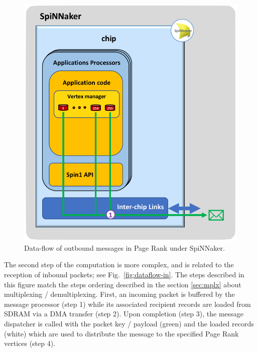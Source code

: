 \begin{figure}[hbtp]
\centering 
\includegraphics[width=0.82\hsize]{figures/impl-dataflow-out.png}
\caption{Data-flow of outbound messages in Page Rank under SpiNNaker.}
\label{fig:dataflow-out}
\end{figure}

The second step of the computation is more complex, and is related to the reception of inbound packets; see Fig.~\ref{fig:dataflow-in}. The steps described in this figure match the steps ordering described in the section \ref{sec:mplx} about multiplexing / demultiplexing. First, an incoming packet is buffered by the message processor (step 1) while its associated recipient records are loaded from SDRAM via a DMA transfer (step 2). Upon completion (step 3), the message dispatcher is called with the packet key / payload (green) and the loaded records (white) which are used to distribute the message to the specified Page Rank vertices (step 4).


